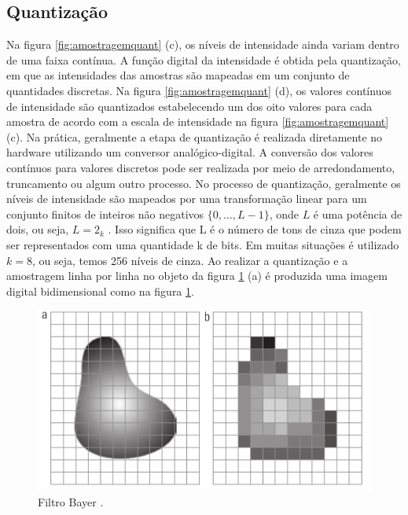 \documentclass[
  brazilian,
]{book}
\begin{document}
\hypertarget{quantizauxe7uxe3o}{%
\subsection{Quantização}\label{quantizauxe7uxe3o}}

Na figura \ref{fig:amostragemquant} (c), os níveis de intensidade ainda variam dentro de uma faixa contínua. A função digital da intensidade é obtida pela quantização, em que as intensidades das amostras são mapeadas em um conjunto de quantidades discretas. Na figura \ref{fig:amostragemquant} (d), os valores contínuos de intensidade são quantizados estabelecendo um dos oito valores para cada amostra de acordo com a escala de intensidade na figura \ref{fig:amostragemquant} (c).
Na prática, geralmente a etapa de quantização é realizada diretamente no hardware utilizando um conversor analógico-digital\autocite[p.8]{burger2009}. A conversão dos valores contínuos para valores discretos pode ser realizada por meio de arredondamento, truncamento ou algum outro processo\autocite[p.9]{bovik2009essential}.
No processo de quantização, geralmente os níveis de intensidade são mapeados por uma transformação linear para um conjunto finitos de inteiros não negativos \(\{0,\dots, L-1\}\), onde \(L\) é uma potência de dois, ou seja, \(L = 2_k\) \autocite[p.10]{bovik2009essential}. Isso significa que L é o número de tons de cinza que podem ser representados com uma quantidade k de bits. Em muitas situações é utilizado \(k = 8\), ou seja, temos 256 níveis de cinza.
Ao realizar a quantização e a amostragem linha por linha no objeto da figura \ref{fig:quantizacao} (a) é produzida uma imagem digital bidimensional como na figura \ref{fig:quantizacao}.



\begin{figure}

{\centering \includegraphics[width=0.6\linewidth]{imagens/02-formacao/quantizacao} 

}

\caption{Filtro Bayer \autocite[p.35]{gonzalez2010}.}\label{fig:quantizacao}
\end{figure}
\end{document}
